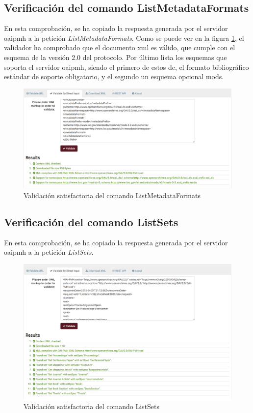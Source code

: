 \subsection{Verificación del comando ListMetadataFormats}

En esta comprobación, se ha copiado la respuesta generada por el servidor \acrshort{oaipmh} a la petición \textit{ListMetadataFormats}. Como se puede ver en la figura \ref{fig:listmetadataformats}, el validador ha comprobado que el documento \acrshort{xml} es válido, que cumple con el esquema de la versión 2.0 del protocolo. Por último lista los esquemas que soporta el servidor \acrshort{oaipmh}, siendo el primero de estos \acrlong{dc}, el formato bibliográfico estándar de soporte obligatorio, y el segundo un esquema opcional \acrfull{mods}\cite{MODS}.

\begin{figure}[!htbp]
	\centering
	\includegraphics[scale=0.31]{fig/oaipmh_validations/ListMetadataFormats}
	\caption{Validación satisfactoria del comando ListMetadataFormats}
	\label{fig:listmetadataformats}
\end{figure}

\subsection{Verificación del comando ListSets}

En esta comprobación, se ha copiado la respuesta generada por el servidor \acrshort{oaipmh} a la petición \textit{ListSets}. 

\begin{figure}[!htbp]
	\centering
	\includegraphics[scale=0.31]{fig/oaipmh_validations/ListSets}
	\caption{Validación satisfactoria del comando ListSets}
	\label{fig:listsets}
\end{figure}

